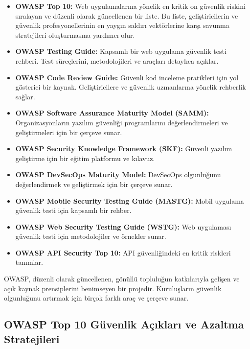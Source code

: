 \begin{itemize}
\item \textbf{OWASP Top 10:} Web uygulamalarına yönelik en kritik on güvenlik riskini sıralayan ve düzenli olarak güncellenen bir liste. Bu liste, geliştiricilerin ve güvenlik profesyonellerinin en yaygın saldırı vektörlerine karşı savunma stratejileri oluşturmasına yardımcı olur.

\item \textbf{OWASP Testing Guide:} Kapsamlı bir web uygulama güvenlik testi rehberi. Test süreçlerini, metodolojileri ve araçları detaylıca açıklar.

\item \textbf{OWASP Code Review Guide:} Güvenli kod inceleme pratikleri için yol gösterici bir kaynak. Geliştiricilere ve güvenlik uzmanlarına yönelik rehberlik sağlar.

\item \textbf{OWASP Software Assurance Maturity Model (SAMM):} Organizasyonların yazılım güvenliği programlarını değerlendirmeleri ve geliştirmeleri için bir çerçeve sunar.

\item \textbf{OWASP Security Knowledge Framework (SKF):} Güvenli yazılım geliştirme için bir eğitim platformu ve kılavuz.

\item \textbf{OWASP DevSecOps Maturity Model:} DevSecOps olgunluğunu değerlendirmek ve geliştirmek için bir çerçeve sunar.

\item \textbf{OWASP Mobile Security Testing Guide (MASTG):} Mobil uygulama güvenlik testi için kapsamlı bir rehber.

\item \textbf{OWASP Web Security Testing Guide (WSTG):} Web uygulaması güvenlik testi için metodolojiler ve örnekler sunar.

\item \textbf{OWASP API Security Top 10:} API güvenliğindeki en kritik riskleri tanımlar.
\end{itemize}

OWASP, düzenli olarak güncellenen, gönüllü topluluğun katkılarıyla gelişen ve açık kaynak prensiplerini benimseyen bir projedir. Kuruluşların güvenlik olgunluğunu artırmak için birçok farklı araç ve çerçeve sunar.

\subsection{OWASP Top 10 Güvenlik Açıkları ve Azaltma Stratejileri}

